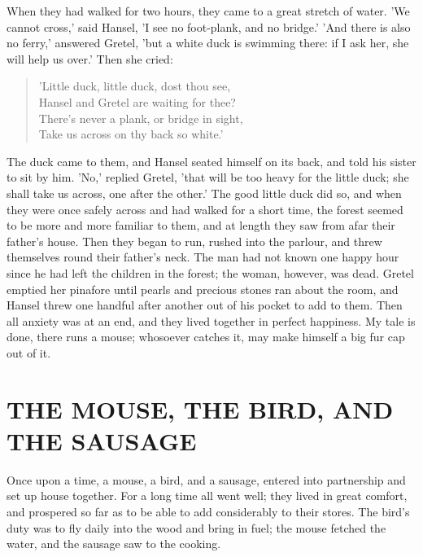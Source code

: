 \documentclass[12pt]{book}
\begin{document}
When they had walked for two hours, they came to a great stretch of
water. 'We cannot cross,' said Hansel, 'I see no foot-plank, and no
bridge.' 'And there is also no ferry,' answered Gretel, 'but a white
duck is swimming there: if I ask her, she will help us over.' Then she
cried:

\begin{verse}
 'Little duck, little duck, dost thou see,\\
  Hansel and Gretel are waiting for thee?\\
  There's never a plank, or bridge in sight,\\
  Take us across on thy back so white.'
\end{verse}

The duck came to them, and Hansel seated himself on its back, and told
his sister to sit by him. 'No,' replied Gretel, 'that will be too
heavy for the little duck; she shall take us across, one after the
other.' The good little duck did so, and when they were once safely
across and had walked for a short time, the forest seemed to be more
and more familiar to them, and at length they saw from afar their
father's house. Then they began to run, rushed into the parlour, and
threw themselves round their father's neck. The man had not known one
happy hour since he had left the children in the forest; the woman,
however, was dead. Gretel emptied her pinafore until pearls and
precious stones ran about the room, and Hansel threw one handful after
another out of his pocket to add to them. Then all anxiety was at an
end, and they lived together in perfect happiness. My tale is done,
there runs a mouse; whosoever catches it, may make himself a big fur
cap out of it.



\chapter{THE MOUSE, THE BIRD, AND THE SAUSAGE}

Once upon a time, a mouse, a bird, and a sausage, entered into
partnership and set up house together. For a long time all went well;
they lived in great comfort, and prospered so far as to be able to add
considerably to their stores. The bird's duty was to fly daily into
the wood and bring in fuel; the mouse fetched the water, and the
sausage saw to the cooking.
\end{document}
